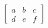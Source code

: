 \documentclass[preview]{standalone}
\begin{document}
\begin{align*}
\begin{bmatrix} a & b & c \\ d & e & f \end{bmatrix}
\end{align*}
\end{document}
